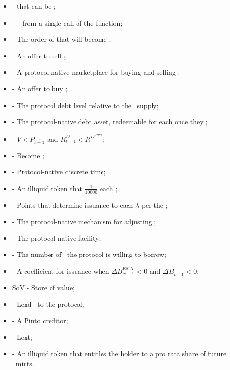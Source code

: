 \documentclass[class=article, crop=false]{standalone}
\begin{document}
\begin{itemize}[topsep=0pt, itemsep=2pt,leftmargin=16pt]
    \item[]  -  that can be ;
    \item[]  - \Pinto\  from a single call of the  function;
    \item[]  - The order of  that will become ;
    \item[]  - An offer to sell ;
    \item[]  - A protocol-native marketplace for buying and selling ;
    \item[]  - An offer to buy ;
    \item[]  - The protocol debt level relative to the \Pinto\ supply;
    \item[]  - The protocol-native debt asset, redeemable for  each once they ;
    \item[]  - $V < P_{\overline{t-1}}$ and $R_{t-1}^{D} < R^{D^{\text{lower}}}$;
    \item[]  - Become ;
    \item[]  - Protocol-native discrete time;
    \item[]  - An illiquid token that  $\frac{1}{10000}$  each ;
    \item[]  - Points that determine  issuance to each $\lambda$ per the ;
    \item[]  - The protocol-native mechanism for adjusting ;
    \item[]  - The protocol-native  facility;
    \item[]  - The number of \Pinto\ the protocol is willing to borrow;
    \item[]  - A coefficient for  issuance when $\Delta B_{\Xi-1}^{\text{EMA}} < 0$ and $\Delta B_{\overline{t-1}} < 0$;
    \item[] SoV - Store of value;
    \item[]  - Lend \Pinto\ to the protocol;
    \item[]  - A Pinto creditor;
    \item[]  - Lent;
    \item[]  - An illiquid token that entitles the holder to a pro rata share of future \Pinto\ mints.

\end{itemize}
\end{document}
